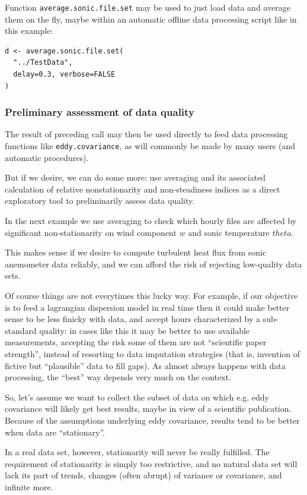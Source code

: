\documentclass[a4paper,10pt]{book}
\begin{document}
Function \verb|average.sonic.file.set| may be used to just load data and average them on the fly, maybe within an automatic offline data processing script like in this example:

\begin{verbatim}
d <- average.sonic.file.set(
  "../TestData",
  delay=0.3, verbose=FALSE
)
\end{verbatim} 

\subsubsection{Preliminary assessment of data quality}

The result of preceding call may then be used directly to feed data processing functions like \verb|eddy.covariance|, as will commonly be made by many users (and automatic procedures).

But if we desire, we can do some more: use averaging and its associated calculation of relative nonstationarity and non-steadiness indices as a direct exploratory tool to preliminarily assess data quality.

In the next example we use averaging to check which hourly files are affected by significant non-stationarity on wind component $w$ and sonic temperature $theta$.

This makes sense if we desire to compute turbulent heat flux from sonic anemometer data reliably, and we can afford the risk of rejecting low-quality data sets.

Of course things are not everytimes this lucky way. For example, if our objective is to feed a lagrangian dispersion model in real time then it could make better sense to be less finicky with data, and accept hours characterized by a sub-standard quality: in cases like this it may be better to use available measurements, accepting the risk some of them are not ``scientific paper strength'', instead of resorting to data imputation strategies (that is, invention of fictive but ``plausible'' data to fill gaps). As almost always happens with data processing, the ``best'' way depends very much on the context.

So, let's assume we want to collect the subset of data on which e.g. eddy covariance will likely get best results, maybe in view of a scientific publication. Because of the assumptions underlying eddy covariance, results tend to be better when data are ``stationary''.

In a real data set, however, stationarity will never be really fulfilled. The requirement of stationarity is simply too restrictive, and no natural data set will lack its part of trends, changes (often abrupt) of variance or covariance, and infinite more.
\end{document}
